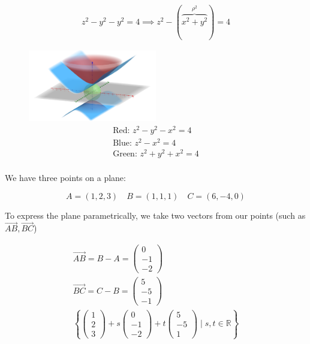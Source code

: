 \documentclass[00_complete]{subfiles}
\begin{document}
\begin{example}
$$
\begin{gathered}
    z^2-y^2-y^2=4 \implies z^2 - (\overbrace{x^2+y^2}^{\rho^2})=4
\end{gathered}
$$

\begin{figure}[ht]
    \centering
      \includegraphics[width=0.5\textwidth]{fig2}
$$
\begin{gathered}
    \text{Red: } z^2-y^2-x^2=4 \\
    \text{Blue: } z^2-x^2=4 \\
    \text{Green: } z^2+y^2+x^2=4 \\
\end{gathered}
$$
\end{figure}

We have three points on a plane:

$$A=(1,2,3) \quad B=(1,1,1) \quad C=(6,-4,0)$$

To express the plane parametrically, we take two vectors from our points (such
as $\vec{AB}, \vec{BC}$)

$$
\begin{gathered}
    \vec{AB} = B - A = \begin{pmatrix}
        0\\-1\\-2
    \end{pmatrix} \\
    \vec{BC}  =C - B = \begin{pmatrix}
        5\\-5\\-1
    \end{pmatrix} \\
    \left\{\begin{pmatrix}
        1\\2\\3
    \end{pmatrix} + s \begin{pmatrix}
        0\\-1\\-2
    \end{pmatrix} + t \begin{pmatrix}
        5\\-5\\1
    \end{pmatrix} \mid s,t \in \mathbb{R}\right\}
\end{gathered}
$$

\end{example}
\end{document}
